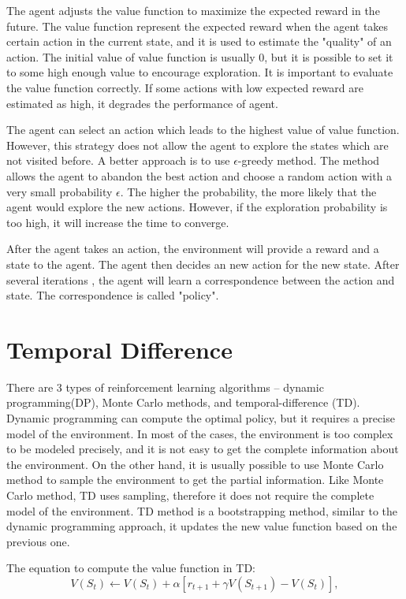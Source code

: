 The agent adjusts the value function to maximize the expected reward in the future.
The value function represent the expected reward when the agent takes certain action in the current
state, and it is used to estimate the "quality" of an action. The initial value of value function is 
usually 0, but it is possible to set it to some high enough value to encourage exploration.
It is important to evaluate the value function 
correctly. If some actions with low expected reward are estimated as high, it degrades the
performance of agent.

The agent can select an action which leads to the highest value of value function. However, 
this strategy does not allow the agent to explore the states which are not visited before.
A better approach is to use $\epsilon$-greedy method. The method allows the agent to abandon the
best action and choose
a random action with a very small probability $\epsilon$. The higher the probability, the more
likely that the agent would explore the new actions. However, if the exploration probability 
is too high, it will increase the time to converge.

After the agent takes an action, the environment will provide a reward and a state to the
agent. The agent then decides an new action for the new state. After several iterations
, the agent will learn a correspondence between the action and state. The correspondence is called 
"policy". 

\section{Temporal Difference}
\label{sec:TD}
There are 3 types of reinforcement learning algorithms -- dynamic programming(DP), Monte Carlo 
methods, and temporal-difference (TD). Dynamic programming can compute the optimal policy, but it 
requires a precise model of the environment. In most of the cases, the environment
is too complex to be modeled precisely, and it is not easy to get the complete information about
the environment. On the other hand, it is usually possible to use Monte Carlo method to sample the environment to
get the partial information. 
Like Monte Carlo method, TD uses sampling, therefore it does not require the 
complete model of the environment. TD method is a bootstrapping method, similar to the dynamic 
programming approach, it updates the new value function based on the previous one.

The equation to compute the value function in TD:
\begin{displaymath}
   V(S_t) \leftarrow V(S_t) + \alpha [r_{t+1} + \gamma V(S_{t+1}) - V(S_t)],
\end{displaymath}

